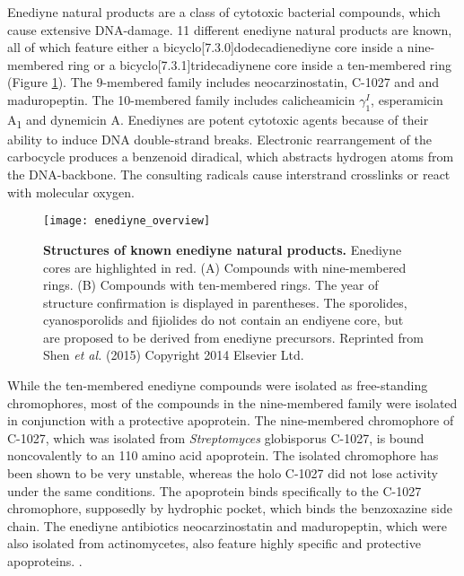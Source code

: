 	 Enediyne natural products are a class of cytotoxic bacterial compounds, which cause extensive DNA-damage.\autocite{Liang2010,Gredicak2007,AdrianL.Smith*1996,Nicolaou1993} 11 different enediyne natural products are known, all of which feature either a bicyclo[7.3.0]dodecadienediyne core inside a nine-membered ring or a bicyclo[7.3.1]tridecadiynene core inside a ten-membered ring (Figure \ref{fig:enediyne_comparison}). The 9-membered family includes neocarzinostatin, C-1027 and and maduropeptin. The 10-membered family includes calicheamicin $\gamma_{1}^{I}$, esperamicin A\textsubscript{1} and dynemicin A. \autocite{Liang2010} Enediynes are potent cytotoxic agents because of their ability to induce DNA double-strand breaks.\autocite{Shen2015} Electronic rearrangement of the carbocycle produces a benzenoid diradical, which abstracts hydrogen atoms from the DNA-backbone. The consulting radicals cause interstrand crosslinks or react with molecular oxygen.	 
	 \begin{figure}[htbp]
	 	\label{fig:enediyne_comparison}
	 	\texttt{[image: enediyne\_overview]}
	 	\caption[Structures of known enediyne natural products]{\textbf{Structures of known enediyne natural products.} Enediyne cores are highlighted in red. (A) Compounds with nine-membered rings. (B) Compounds with ten-membered rings. The year of structure confirmation is displayed in parentheses. The sporolides, cyanosporolids and fijiolides do not contain an endiyene core, but are proposed to be derived from enediyne precursors. Reprinted from Shen \textit{et al.} (2015) Copyright 2014 Elsevier Ltd.}
	 \end{figure}
	 While the ten-membered enediyne compounds were isolated as free-standing chromophores, most of the compounds in the nine-membered family were isolated in conjunction with a protective apoprotein.\autocite{Liang2010} The nine-membered chromophore of C-1027, which was isolated from \textit{Streptomyces} globisporus C-1027, is bound noncovalently to an 110 amino acid apoprotein.\autocite{AdrianL.Smith*1996,Minami1993,Yoshida1993,Otani1993,Sugiura1993,Matsumoto1993,Otani1991,Otani1988a,Matsumoto1993a} The isolated chromophore has been shown to be very unstable, whereas the holo C-1027 did not lose activity under the same conditions. \autocite{Matsumoto1993,Sugiura1993,Otani1991} The apoprotein binds specifically to the C-1027 chromophore, supposedly by hydrophic pocket, which binds the benzoxazine side chain. \autocite{Okuno1994,Matsumoto1993} The enediyne antibiotics neocarzinostatin and maduropeptin, which were also isolated from actinomycetes, also feature highly specific and protective apoproteins. \autocite{AdrianL.Smith*1996}.
	 
